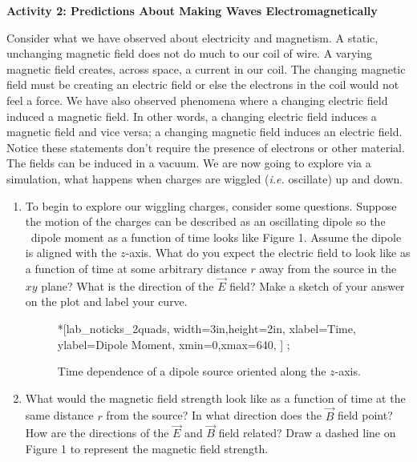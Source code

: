 \textbf{Activity 2: Predictions About Making Waves Electromagnetically}

Consider what we have observed about electricity and magnetism.
A static, unchanging magnetic field does not do much to our coil of wire.
A varying magnetic field creates, across space, a current in our coil.
The changing magnetic field must be creating an electric field or else the electrons
in the coil would not feel a force.
We have also observed phenomena where a changing electric field induced a magnetic
field.
In other words, a changing electric field induces a magnetic field and vice versa;
a changing magnetic field induces an electric field.
Notice these statements don't require the presence of electrons or other material.
The fields can be induced in a vacuum.
We are now going to explore via a simulation, what happens when  charges are wiggled
(\textit{i.e.} oscillate) up and down.

\begin{enumerate}[labparts]

\item To begin to explore our wiggling charges, consider some questions.
Suppose the motion of the charges can be described as an oscillating dipole so the \
dipole moment as a function of time looks like Figure 1.
Assume the dipole is aligned with the $z$-axis.
What do you expect the electric field to look like as a function of time 
at some arbitrary distance $r$
away from the source in the $xy$ plane?
What is the direction of the $\vec E$ field?
Make a sketch of your answer on the plot and label your curve.
\begin{figure}[hbt]
\begin{lab_axis}*[lab_noticks_2quads,
	width=3in,height=2in,
	xlabel=Time,
	ylabel=Dipole Moment,
	xmin=0,xmax=640,
]
;
\end{lab_axis}


\caption{Time dependence of a dipole source oriented along the $z$-axis.}
\end{figure}


\item What would the magnetic field strength look like as a function of time at the same 
distance $r$ from the source?
In what direction does the $\vec B$ field point?
How are the directions of the $\vec E$ and $\vec B$ field related?
Draw a dashed line on Figure 1 to represent the magnetic field strength.
\vspace{2.0cm}

\end{enumerate}


